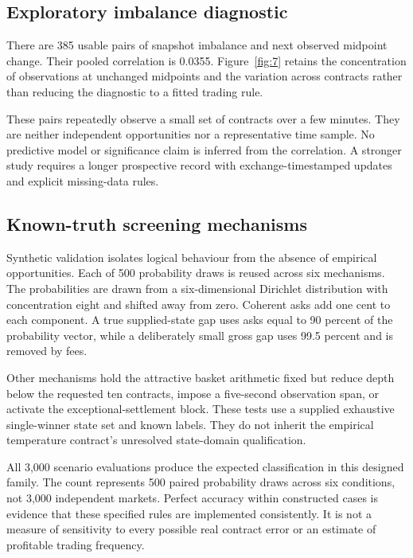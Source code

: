 \subsection{Exploratory imbalance diagnostic}
There are 385 usable pairs of snapshot imbalance and next observed midpoint change. Their pooled correlation is 0.0355. Figure~\ref{fig:7} retains the concentration of observations at unchanged midpoints and the variation across contracts rather than reducing the diagnostic to a fitted trading rule.


These pairs repeatedly observe a small set of contracts over a few minutes. They are neither independent opportunities nor a representative time sample. No predictive model or significance claim is inferred from the correlation. A stronger study requires a longer prospective record with exchange-timestamped updates and explicit missing-data rules.

\label{sec:synthetic}
\subsection{Known-truth screening mechanisms}
Synthetic validation isolates logical behaviour from the absence of empirical opportunities. Each of 500 probability draws is reused across six mechanisms. The probabilities are drawn from a six-dimensional Dirichlet distribution with concentration eight and shifted away from zero. Coherent asks add one cent to each component. A true supplied-state gap uses asks equal to 90 percent of the probability vector, while a deliberately small gross gap uses 99.5 percent and is removed by fees.

Other mechanisms hold the attractive basket arithmetic fixed but reduce depth below the requested ten contracts, impose a five-second observation span, or activate the exceptional-settlement block. These tests use a supplied exhaustive single-winner state set and known labels. They do not inherit the empirical temperature contract's unresolved state-domain qualification.


All 3,000 scenario evaluations produce the expected classification in this designed family. The count represents 500 paired probability draws across six conditions, not 3,000 independent markets. Perfect accuracy within constructed cases is evidence that these specified rules are implemented consistently. It is not a measure of sensitivity to every possible real contract error or an estimate of profitable trading frequency.

